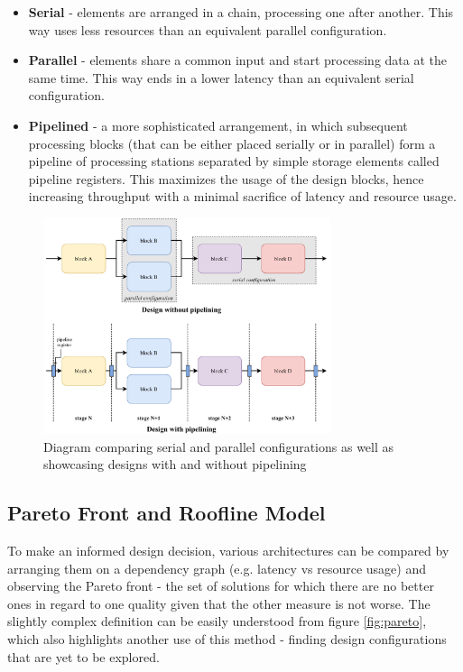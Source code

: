 \begin{itemize}
  \item \textbf{Serial} - elements are arranged in a chain, processing one after another. This way uses less resources than an equivalent parallel configuration.
  \item \textbf{Parallel} - elements share a common input and start processing data at the same time. This way ends in a lower latency than an equivalent serial configuration.
  \item \textbf{Pipelined} - a more sophisticated arrangement, in which subsequent processing blocks (that can be either placed serially or in parallel) form a pipeline of processing stations separated by simple storage elements called pipeline registers. This maximizes the usage of the design blocks, hence increasing throughput with a minimal sacrifice of latency and resource usage.
\end{itemize}

\begin{figure}[hpt!]
  \centering
  \includegraphics[trim={0cm 0cm 0cm 0cm}, width=0.75\textwidth, center]{background/serial_parallel_pipelined.pdf}
  \caption{Diagram comparing serial and parallel configurations as well as showcasing designs with and without pipelining}
  \label{fig:serial-parallel-pipelined}
\end{figure}

\pagebreak
\subsection{Pareto Front and Roofline Model}
To make an informed design decision, various architectures can be compared by arranging them on a dependency graph (e.g. latency vs resource usage) and observing the Pareto front - the set of solutions for which there are no better ones in regard to one quality given that the other measure is not worse. The slightly complex definition can be easily understood from figure \ref{fig:pareto}, which also highlights another use of this method - finding design configurations that are yet to be explored.

